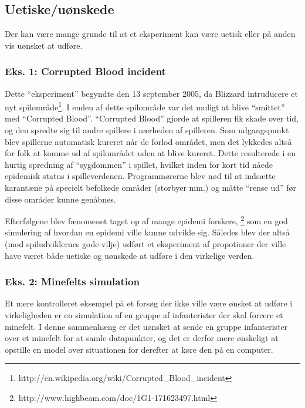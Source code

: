 \subsection{Uetiske/uønskede}
Der kan være mange grunde til at et eksperiment kan være uetisk eller på anden
vis uønsket at udføre.

\subsubsection{Eks. 1: Corrupted Blood incident}
Dette ``eksperiment'' begyndte den 13 september 2005, da Blizzard intruducere et nyt
spilområde\footnote{http://en.wikipedia.org/wiki/Corrupted\_Blood\_incident}.
I enden af dette spilområde var det muligt at blive ``smittet'' med ``Corrupted
Blood''. ``Corrupted Blood'' gjorde at spilleren fik skade over tid, og den
spredte sig til andre spillere i nærheden af spilleren. Som udgangspunkt blev
spillerne automatisk kureret når de forlod området, men det lykkedes altså for folk
at komme ud af spilområdet uden at blive kureret. Dette resulterede i en hurtig spredning
af ``sygdommen'' i spillet, hvilket inden for kort tid nåede epidemisk status i spilleverdenen.
Programmørerne blev nød til at indsætte karantæne på specielt befolkede områder (storbyer mm.)
og måtte ``rense ud'' før disse områder kunne genåbnes.

Efterfølgene blev fænomenet taget op af mange epidemi forskere,
\footnote{http://www.highbeam.com/doc/1G1-171623497.html} som en god simulering
af hvordan en epidemi ville kunne udvikle sig. Således blev der altså (mod spiludviklernes
gode vilje) udført et eksperiment af propotioner der ville have været både uetiske og
uønskede at udføre i den virkelige verden.

\subsubsection{Eks. 2: Minefelts simulation}
Et mere kontrolleret eksempel på et forsøg der ikke ville være ønsket at udføre i
virkeligheden er en simulation af en gruppe af infanterister der skal forcere et
minefelt. I denne sammenhæng er det uønsket at sende en gruppe infanterister over
et minefelt for at samle datapunkter, og det er derfor mere ønskeligt at opstille
en model over situationen for derefter at køre den på en computer.
